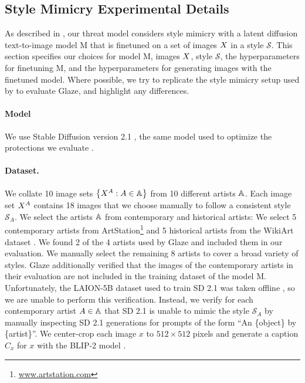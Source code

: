 \documentclass{article}
\newcommand{\style}[1]{\mathcal{#1}}
\newcommand{\model}[1]{\mathrm{#1}}
\begin{document}
\subsection{Style Mimicry Experimental Details}
\label{sec:stylemimicryconf}

As described in , our threat model
considers style mimicry with a latent diffusion text-to-image model $\model{M}$
that is finetuned on a set of images $X$ in a style $\style{S}$. This section specifies our choices for model $\model{M}$, images $X$, style $\style{S}$, the hyperparameters for finetuning $\model{M}$, and the hyperparameters for generating images with the finetuned model. Where possible, we
try to replicate the style mimicry setup used by \citeauthor{glaze}
to evaluate Glaze, and highlight any differences.

\paragraph{Model} We use Stable Diffusion version 2.1 \citep{sd21}, the same model used to optimize the protections we evaluate \citep{glaze,mist,antidreambooth}. %

\paragraph{Dataset.} We collate 10 image sets $\left\{X^{A} : A \in {\mathbb{A}}\right\}$ from 10 different artists ${\mathbb{A}}$.
Each image set $X^{A}$ contains 18 images that we choose manually to follow
a consistent style $\style{S}_A$. We select the artists ${\mathbb{A}}$ from contemporary and historical artists: We select 5 contemporary artists from ArtStation\footnote{\url{www.artstation.com}} and 5 historical artists from the WikiArt dataset \citep{wikiart}. We found 2 of the 4 artists used by Glaze and included them in our evaluation. We manually select the remaining 8 artists to cover a broad variety of styles. 
Glaze additionally verified that the images of the contemporary artists in their evaluation are not included in the training dataset of the model $\model{M}$.  Unfortunately, the LAION-5B dataset \citep{laion} used to train SD 2.1 was taken offline \citep{laionoffline}, so we are unable to perform this verification. Instead, we verify for each contemporary artist $A \in {\mathbb{A}}$ that SD 2.1 is unable to mimic the style $\style{S}_{A}$ by 
manually inspecting SD 2.1 generations for prompts of the form
``An \{object\} by \{artist\}''. We center-crop each image $x$ to $512 \times 512$ pixels and generate a caption $C_x$ for $x$ with the BLIP-2 model \citep{blip2}.
\end{document}
